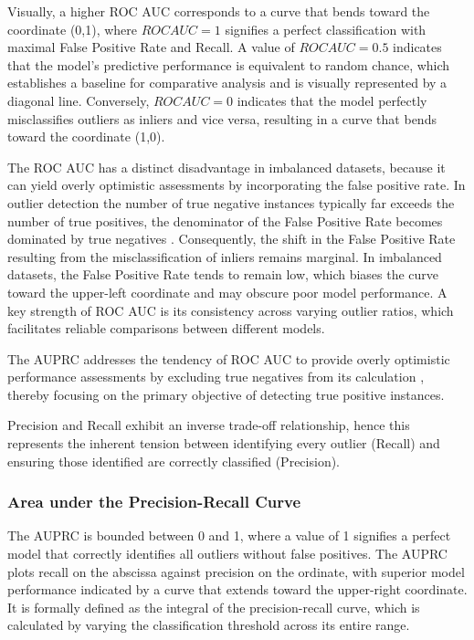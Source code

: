 Visually, a higher ROC AUC corresponds to a curve that bends toward the coordinate (0,1), where $ROC AUC=1$ signifies a perfect classification with maximal False Positive Rate and Recall. 
A value of $ROC AUC=0.5$ indicates that the model's predictive performance is equivalent to random chance, which establishes a baseline for comparative analysis and is visually represented by a diagonal line. 
Conversely, $ROC AUC=0$ indicates that the model perfectly misclassifies outliers as inliers and vice versa, resulting in a curve that bends toward the coordinate (1,0).


The ROC AUC has a distinct disadvantage in imbalanced datasets, because it can yield overly optimistic assessments by incorporating the false positive rate. 
In outlier detection the number of true negative instances typically far exceeds the number of true positives, the denominator of the False Positive Rate becomes dominated by true negatives \citep{davis2006relationship}. 
Consequently, the shift in the False Positive Rate resulting from the misclassification of inliers remains marginal. 
In imbalanced datasets, the False Positive Rate tends to remain low, which biases the curve toward the upper-left coordinate and may obscure poor model performance. 
A key strength of ROC AUC is its consistency across varying outlier ratios, which facilitates reliable comparisons between different models.

\begin{sloppypar}
The AUPRC addresses the tendency of ROC AUC to provide overly optimistic performance assessments by excluding true negatives from its calculation \citep[p. 12]{saito2015precision}, thereby focusing on the primary objective of detecting true positive instances. 
\end{sloppypar}
Precision and Recall exhibit an inverse trade-off relationship, hence this represents the inherent tension between identifying every outlier (Recall) and ensuring those identified are correctly classified (Precision). 


\subsubsection*{Area under the Precision-Recall Curve}
The AUPRC \citep{davis2006relationship} is bounded between 0 and 1, where a value of 1 signifies a perfect model that correctly identifies all outliers without false positives. 
The AUPRC plots recall on the abscissa against precision on the ordinate, with superior model performance indicated by a curve that extends toward the upper-right coordinate. 
It is formally defined as the integral of the precision-recall curve, which is calculated by varying the classification threshold across its entire range.


